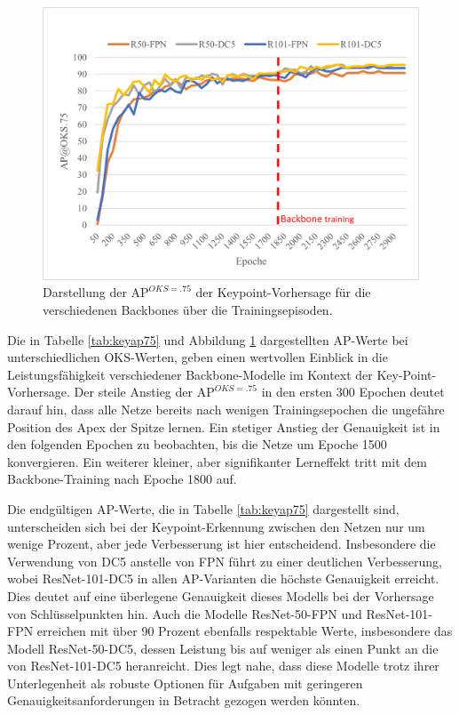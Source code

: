 \begin{figure}[h]
    \centering
    \includegraphics[trim={.3cm .25cm .2cm 1cm}, clip]{img/eval/keyap75.png}
    \caption{Darstellung der $\text{AP}^{OKS=.75}$ der Keypoint-Vorhersage für die verschiedenen Backbones über die Trainingsepisoden.}
    \label{fig:keyap75}
\end{figure}
Die in Tabelle \ref{tab:keyap75} und Abbildung \ref{fig:keyap75} dargestellten AP-Werte bei unterschiedlichen OKS-Werten, geben einen wertvollen Einblick in die Leistungsfähigkeit verschiedener Backbone-Modelle im Kontext der Key-Point-Vorhersage. Der steile Anstieg der $\text{AP}^{OKS=.75}$ in den ersten 300 Epochen deutet darauf hin, dass alle Netze bereits nach wenigen Trainingsepochen die ungefähre Position des Apex der Spitze lernen. Ein stetiger Anstieg der Genauigkeit ist in den folgenden Epochen zu beobachten, bis die Netze um Epoche 1500 konvergieren. Ein weiterer kleiner, aber signifikanter Lerneffekt tritt mit dem Backbone-Training nach Epoche 1800 auf.

Die endgültigen AP-Werte, die in Tabelle \ref{tab:keyap75} dargestellt sind, unterscheiden sich bei der Keypoint-Erkennung zwischen den Netzen nur um wenige Prozent, aber jede Verbesserung ist hier entscheidend. Insbesondere die Verwendung von DC5 anstelle von FPN führt zu einer deutlichen Verbesserung, wobei ResNet-101-DC5 in allen AP-Varianten die höchste Genauigkeit erreicht. Dies deutet auf eine überlegene Genauigkeit dieses Modells bei der Vorhersage von Schlüsselpunkten hin.
Auch die Modelle ResNet-50-FPN und ResNet-101-FPN erreichen mit über 90 Prozent ebenfalls respektable Werte, insbesondere das Modell ResNet-50-DC5, dessen Leistung bis auf weniger als einen Punkt an die von ResNet-101-DC5 heranreicht. Dies legt nahe, dass diese Modelle trotz ihrer Unterlegenheit als robuste Optionen für Aufgaben mit geringeren Genauigkeitsanforderungen in Betracht gezogen werden könnten.

